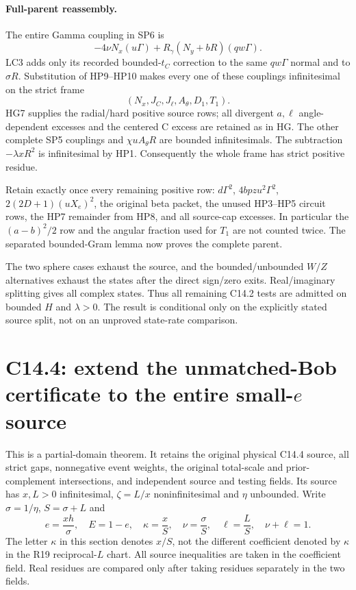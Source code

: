 \paragraph{Full-parent reassembly.}
The entire Gamma coupling in SP6 is
\[
 -4\nu N_x(u\Gamma)+R_\gamma(N_y+bR)(qw\Gamma).
\]
LC3 adds only its recorded bounded-$t_C$ correction to the same
$qw\Gamma$ normal and to $\sigma R$.  Substitution of HP9--HP10
makes every one of these couplings infinitesimal on the strict frame
\[
 (N_x,J_C,J_\ell,A_\theta,D_1,T_1).
\]
HG7 supplies the radial/hard positive source rows; all divergent
$a,\ell$ angle-dependent excesses and the centered C excess are
retained as in HG.  The other complete SP5 couplings and
$\chi uA_\theta R$ are bounded infinitesimals.  The subtraction
$-\lambda xR^2$ is infinitesimal by HP1.  Consequently the whole
frame has strict positive residue.

Retain exactly once every remaining positive row: $d\Gamma^2$,
$4bpzu^2\Gamma^2$, $2(2D+1)(uX_e)^2$, the original beta packet,
the unused HP3--HP5 circuit rows, the HP7 remainder from HP8, and
all source-cap excesses.  In particular the $(a-b)^2/2$ row and
the angular fraction used for $T_1$ are not counted twice.
The separated bounded-Gram lemma now proves the complete parent.

The two sphere cases exhaust the source, and the bounded/unbounded
$W/Z$ alternatives exhaust the states after the direct sign/zero
exits.  Real/imaginary splitting gives all complex states.  Thus all
remaining C14.2 tests are admitted on bounded $H$ and $\lambda>0$.
The result is conditional only on the explicitly stated source split,
not on an unproved state-rate comparison.


\section{\texorpdfstring{C14.4: extend the unmatched-Bob certificate to the entire small-$e$ source}{C14.4: extend the unmatched-Bob certificate to the entire small-e source}}
\label{component:p8c30238a5f7d}

\label{p8c30238a5f7d:sec:recovery-c144-small-e}

This is a partial-domain theorem. It retains the original physical C14.4
source, all strict gaps, nonnegative event weights, the original total-scale
and prior-complement intersections, and independent source and testing fields.
Its source has $x,L>0$ infinitesimal, $\zeta=L/x$ noninfinitesimal and
$\eta$ unbounded. Write $\sigma=1/\eta$, $S=\sigma+L$ and
\[
 e=\frac{xh}{\sigma},\quad E=1-e,\quad
 \kappa=\frac{x}{S},\quad \nu=\frac{\sigma}{S},\quad
 \ell=\frac{L}{S},\quad \nu+\ell=1.
 \tag{SE1}
\]
The letter $\kappa$ in this section denotes $x/S$, not the different
coefficient denoted by $\kappa$ in the R19 reciprocal-$L$ chart.
All source inequalities are taken in the coefficient field. Real residues
are compared only after taking residues separately in the two fields.

